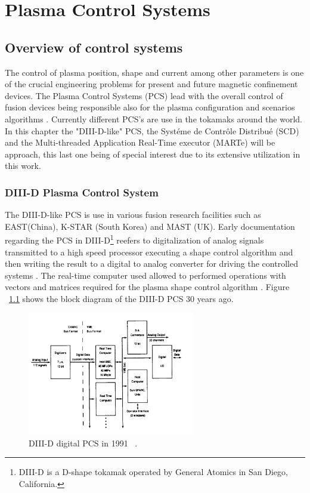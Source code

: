 \chapter{Plasma Control Systems}

\section{Overview of control systems}
The control of  plasma position, shape and current among other parameters is one of the crucial engineering problems for present and future magnetic confinement devices. The Plasma Control Systems (PCS) lead with the overall control of  fusion devices being responsible also for the  plasma configuration and scenarios algorithms \cite[Chapter~8]{PCS_2018}. Currently different PCS's are use in the tokamaks around the world. In this chapter the "DIII-D-like" PCS, the Syst\'eme de Contr\^ole Distribu\'e (SCD) and the Multi-threaded Application Real-Time executor (MARTe) will be approach, this last one being of special interest due to its extensive utilization in this work.

\subsection{DIII-D Plasma Control System}  

The DIII-D-like PCS is use in various fusion research facilities such as EAST(China), K-STAR (South Korea) and MAST (UK). Early documentation regarding the PCS in DIII-D\footnote{DIII-D is a D-shape tokamak operated by General Atomics in San Diego, California. } reefers to digitalization of analog signals transmitted to a high speed processor executing a shape control algorithm and then writing the result to a digital to analog converter for driving the controlled systems . The real-time computer used allowed to performed operations with vectors and matrices required for the plasma shape control algorithm \cite{DIIDcontrol}. Figure ~\ref{DIII1991} shows the block diagram of the DIII-D PCS 30 years ago.
\smallskip

\begin{figure}[htbp]
	\centering
	\includegraphics[width=0.65\textwidth]{Chp2/DIIDPCS_old.PNG}
	\caption{\label{DIII1991} DIII-D digital PCS in 1991 ~\cite{DIIDcontrol}.  }
\end{figure}

